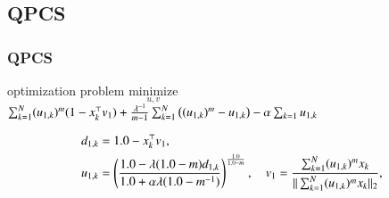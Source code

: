 \documentclass[fleqn,dvipdfmx,10pt]{beamer}
\begin{document}
\subsection{QPCS}
\begin{frame}\frametitle{QPCS}%
  \begin{block}{optimization problem}
    $\underset{u,v}{\text{minimize}}$
    $\sum_{k=1}^N(u_{1,k})^m(1-x_k^{\top}v_1)+\frac{\lambda^{-1}}{m-1}\sum_{k=1}^N\left((u_{1,k})^m-u_{1,k}\right)-\alpha\sum_{k=1}u_{1,k}$\centering\\
  \end{block}
  \begin{align*}
    d_{1,k}&=1.0-x_k^{\top}v_1,\\
   u_{1,k}&=\left(\frac{1.0-\lambda(1.0-m)d_{1,k}}{1.0+\alpha\lambda(1.0-m^{-1})}\right)^{\frac{1.0}{1.0-m}},\quad
   v_{1}=\frac{\sum_{k=1}^N (u_{1,k})^m x_{k}}{||\sum_{k=1}^N (u_{1,k})^mx_{k}||_2},\\
  \end{align*}
\end{frame}
\end{document}
